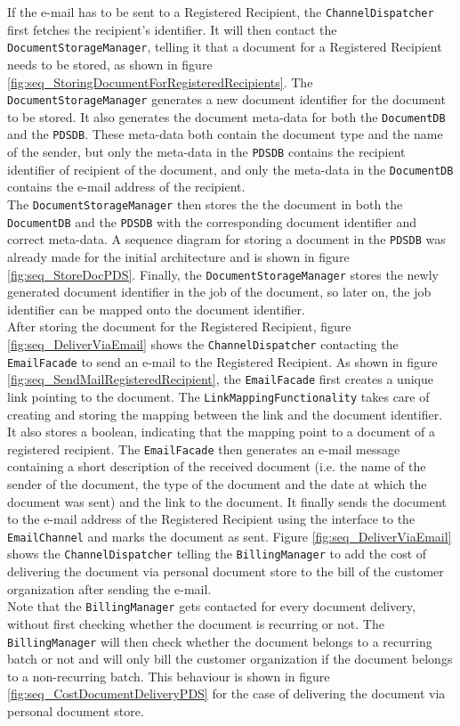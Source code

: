 \documentclass[a4paper,10pt]{article}
\begin{document}
If the e-mail has to be sent to a Registered Recipient, the \texttt{ChannelDispatcher} first fetches the recipient's identifier. It will then contact the \texttt{DocumentStorageManager}, telling it that a document for a Registered Recipient needs to be stored, as shown in figure \ref{fig:seq_StoringDocumentForRegisteredRecipients}. The \texttt{DocumentStorageManager} generates a new document identifier for the document to be stored. It also generates the document meta-data for both the \texttt{DocumentDB} and the \texttt{PDSDB}. These meta-data both contain the document type and the name of the sender, but only the meta-data in the \texttt{PDSDB} contains the recipient identifier of recipient of the document, and only the meta-data in the \texttt{DocumentDB} contains the e-mail address of the recipient.\\ The \texttt{DocumentStorageManager} then stores the the document in both the 
\texttt{DocumentDB} and the \texttt{PDSDB} with the corresponding document identifier and correct meta-data. A sequence diagram for storing a document in the \texttt{PDSDB} was already made for the initial architecture and is shown in figure \ref{fig:seq_StoreDocPDS}. Finally, the \texttt{DocumentStorageManager} stores the newly generated document identifier in the job of the document, so later on, the job identifier can be mapped onto the document identifier.\\
After storing the document for the 
Registered Recipient, figure \ref{fig:seq_DeliverViaEmail} shows the \texttt{ChannelDispatcher} contacting the \texttt{EmailFacade} to send an e-mail to the Registered Recipient. As shown in figure \ref{fig:seq_SendMailRegisteredRecipient}, the \texttt{EmailFacade} first creates a unique link pointing to the document. The \texttt{LinkMappingFunctionality} takes care of creating and storing the mapping between the link and the document identifier. It also stores a boolean, indicating that the mapping point to a document of a registered recipient. The \texttt{EmailFacade} then generates an e-mail message containing a short description of the received document (i.e. the name of the sender of the document, the type of the document and the date at which the document was sent) and the link to the document. It finally sends the document to the e-mail address of the Registered Recipient using the interface to the \texttt{EmailChannel} and marks the document as sent. Figure \ref{fig:seq_DeliverViaEmail} shows the \texttt{ChannelDispatcher} telling the \texttt{BillingManager} to add the cost of delivering the document via personal document store to the bill of the customer organization after sending the e-mail.\\
Note that the \texttt{BillingManager} gets contacted for every document delivery, without first checking whether the document is recurring or not. The \texttt{BillingManager} will then check whether the document belongs to a recurring batch or not and will only bill the customer organization if the document belongs to a non-recurring batch. This behaviour is shown in figure \ref{fig:seq_CostDocumentDeliveryPDS} for the case of delivering the document via personal document store. 
\end{document}
